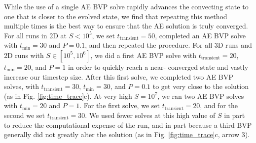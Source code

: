 \documentclass[aps, pre, onecolumn, nofootinbib, notitlepage, groupedaddress, amsfonts, amssymb, amsmath, longbibliography]{revtex4-1}
\begin{document}
While the use of a single AE BVP solve rapidly advances the convecting state to
one that is closer to the evolved state, we find that repeating this method 
multiple times is the best way to
ensure that the AE solution is truly converged. For all runs in 2D at $S < 10^5$, we
set $t_{\text{transient}} = 50$, completed an AE BVP solve
with $t_{\text{min}} = 30$ and $P = 0.1$, and then repeated the procedure.
For all 3D runs and 2D runs with $S \in [10^5, 10^6]$,
we did a first AE BVP solve with $t_{\text{transient}} = 20$,
$t_{\text{min}} = 20$, and $P = 1$ in order to quickly reach a near-
converged state and vastly increase our timestep size.  After this first solve, 
we completed two AE BVP solves, with $t_{\text{transient}} = 30$,
$t_{\text{min}} = 30$, 
and $P = 0.1$ to get very close to the solution (as in Fig. \ref{fig:time_trace}c).
At very high $S = 10^7$, we ran two AE BVP solves with $t_{\text{min}} = 20$ and
$P = 1$. For the first solve, we set $t_{\text{transient}} = 20$, and for the
second we set $t_{\text{transient}} = 30$. We used fewer solves at this high
value of $S$ in part to reduce the computational expense of the run, and in
part because a third BVP generally did not greatly alter the solution
(as in Fig. \ref{fig:time_trace}c, arrow 3).
\end{document}
